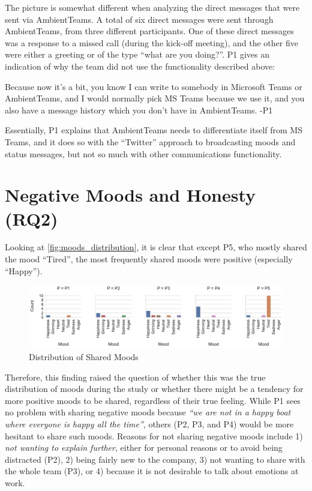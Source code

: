 The picture is somewhat different when analyzing the direct messages that were sent via AmbientTeams. A total of six direct messages were sent through AmbientTeams, from three different participants. One of these direct messages was a response to a missed call (during the kick-off meeting), and the other five were either a greeting or of the type \enquote{what are you doing?}. P1 gives an indication of why the team did not use the functionality described above:

\begin{displayquote}
    Because now it's a bit, you know I can write to somebody in Microsoft Teams or AmbientTeams, and I would normally pick MS Teams because we use it, and you also have a message history which you don't have in AmbientTeams. -P1
\end{displayquote}

Essentially, P1 explains that AmbientTeams needs to differentiate itself from MS Teams, and it does so with the \enquote{Twitter} approach to broadcasting moods and status messages, but not so much with other communications functionality.

\section{Negative Moods and Honesty (RQ2)}
\label{section:negative_moods_and_honesty}

Looking at \autoref{fig:moods_distribution}, it is clear that except P5, who mostly shared the mood \enquote{Tired}, the most frequently shared moods were positive (especially \enquote{Happy}).

\begin{figure}[h]
    \centering
    \includegraphics[width=\linewidth]{plots/moods_distribution.pdf}
    \caption{Distribution of Shared Moods}
    \label{fig:moods_distribution}
\end{figure}

Therefore, this finding raised the question of whether this was the true distribution of moods during the study or whether there might be a tendency for more positive moods to be shared, regardless of their true feeling. While P1 sees no problem with sharing negative moods because \textit{\enquote{we are not in a happy boat where everyone is happy all the time}}, others (P2, P3, and P4) would be more hesitant to share such moods. Reasons for not sharing negative moods include 1) \textit{not wanting to explain further}, either for personal reasons or to avoid being distracted (P2), 2) being fairly new to the company, 3) not wanting to share with the whole team (P3), or 4) because it is not desirable to talk about emotions at work.

